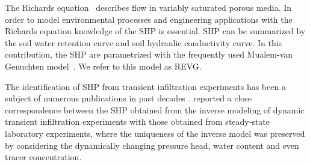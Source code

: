 \documentclass[review,times,3p,10pt]{elsarticle}
\begin{document}
The Richards equation~\citep{richards} describes flow in variably saturated porous media. In order to model environmental processes and engineering applications with the Richards equation knowledge of the SHP is essential. SHP can be summarized by the soil water retention curve and soil hydraulic conductivity curve. In this contribution, the SHP are parametrized with the frequently used Mualem-van Genuchten model~\citep{vangenuchten}. We refer to this model as REVG.







 
The identification of SHP from transient infiltration experiments has been a subject of numerous publications in past decades \citep{simunek-infiltr2shp, infiltr2shp, simunek2-infiltr2shp, XU201234, BAGARELLO201770,  hess-Younes-2017}.  \cite{simunek-infiltr2shp} reported a close correspondence between the SHP obtained from the inverse modeling of dynamic transient infiltration experiments with those obtained from steady-state laboratory experiments, where the uniqueness of the inverse model was preserved by considering the dynamically changing pressure head, water content and even tracer concentration. %
\end{document}

